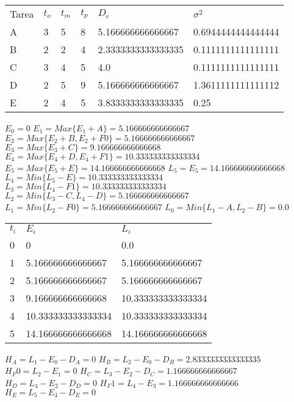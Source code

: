 \begin{table}[]
\begin{tabular}{llllll}
Tarea & $t_o$ & $t_m$ & $t_p$ & $D_e$ & $\sigma^{2}$ \\
A & 3 & 5 & 8 & 5.166666666666667 & 0.6944444444444444 \\
B & 2 & 2 & 4 & 2.3333333333333335 & 0.1111111111111111 \\
C & 3 & 4 & 5 & 4.0 & 0.1111111111111111 \\
D & 2 & 5 & 9 & 5.166666666666667 & 1.3611111111111112 \\
E & 2 & 4 & 5 & 3.8333333333333335 & 0.25 \\
\end{tabular}
\end{table}




$E_0 = 0$
$E_1 = Max \{E_1 + A\} = 5.166666666666667$
$E_2 = Max \{E_2 + B, E_2 + F0\} = 5.166666666666667$
$E_3 = Max \{E_3 + C\} = 9.166666666666668$
$E_4 = Max \{E_4 + D, E_4 + F1\} = 10.333333333333334$
$E_5 = Max \{E_5 + E\} = 14.166666666666668$
$L_5 = E_5 = 14.166666666666668$
$L_4 = Min \{L_5 - E\} = 10.333333333333334$
$L_3 = Min \{L_4 - F1\} = 10.333333333333334$
$L_2 = Min \{L_3 - C, L_4 - D\} = 5.166666666666667$
$L_1 = Min \{L_2 - F0\} = 5.166666666666667$
$L_0 = Min \{L_1 - A, L_2 - B\} = 0.0$




\begin{table}[]
\begin{tabular}{lll}
$t_i$ & $E_i$ & $L_i$ \\
0 & 0 & 0.0 \\
1 & 5.166666666666667 & 5.166666666666667 \\
2 & 5.166666666666667 & 5.166666666666667 \\
3 & 9.166666666666668 & 10.333333333333334 \\
4 & 10.333333333333334 & 10.333333333333334 \\
5 & 14.166666666666668 & 14.166666666666668 \\
\end{tabular}
\end{table}




$H_A = L_1 - E_0 - D_A = 0$
$H_B = L_2 - E_0 - D_B = 2.8333333333333335$
$H_F0 = L_2 - E_1 = 0$
$H_C = L_3 - E_2 - D_C = 1.166666666666667$
$H_D = L_4 - E_2 - D_D = 0$
$H_F1 = L_4 - E_3 = 1.166666666666666$
$H_E = L_5 - E_4 - D_E = 0$





